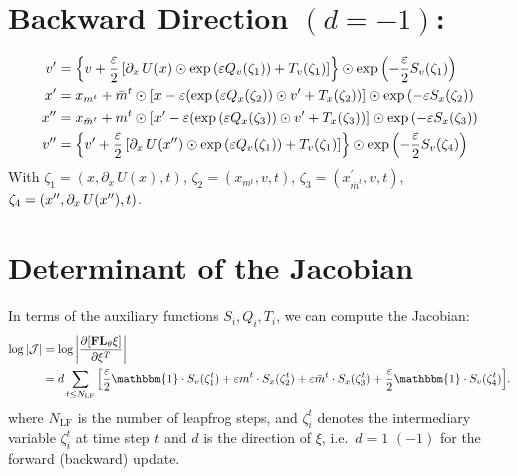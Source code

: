 \section{Backward Direction \texorpdfstring{$(d = -1)$}{(d = -1)}:}%
\label{sec:lf_backward}
%
\begin{align}
  v^{\prime} &= {\left\{v + \frac{\eps}{2}\left[\partial_{x}\,U(x)\odot
        \exp{\left(\eps Q_{v}(\zeta_{1})\right)}%
    + T_{v}(\zeta_{1})\right]\right\}} \odot
    \exp{\left(-\frac{\eps}{2}S_{v}(\zeta_{1})\right)} \\
  \xp &= x_{m^{t}} + \bar{m}^{t}\odot%
    {\left[x - \eps{\left(\exp{\left(\eps Q_{x}(\zeta_{2})\right)}\odot \vp%
    + T_{x}(\zeta_{2})\right)}\right]}\odot \exp{\left(-\eps
    S_{x}(\zeta_{2})\right)} \\ 
  \xpp &= x_{\bar{m}^{t}} + m^{t}\odot%
    {\left[\xp - \eps{\left(\exp{\left(\eps Q_{x}(\zeta_{3})\right)}\odot \vp%
    + T_{x}(\zeta_{3})\right)}\right]}\odot \exp{\left(-\eps
    S_{x}(\zeta_{3})\right)} \\
  v^{\prime\prime} &= {\left\{\vp +
      \frac{\eps}{2}\left[\partial_{x}\,U(\xpp)\odot%
        \exp{\left(\eps Q_{v}(\zeta_{1})\right)}
  + T_{v}(\zeta_{1})\right]\right\}}\odot 
    \exp{\left(-\frac{\eps}{2}S_{v}(\zeta_{4})\right)}
\label{eq:backward_update}
\end{align}
%
With $\zeta_{1} = (x, \partial_{x}\, U(x), t)$, $\zeta_{2} = (x_{m^{t}}, v,
t)$, $\zeta_{3} = (x^{\prime}_{\bar{m}^{t}}, v, t)$, $\zeta_{4} = ({x^{\prime\prime}},
\partial_{x}\, U({x^{\prime\prime}}), t)$.
%
\section{Determinant of the Jacobian}
In terms of the auxiliary functions $S_{i}, Q_{i}, T_{i}$, we can compute the
Jacobian:
%
\begin{align}
  \log|\mathcal{J}| 
  &= \log\bigg|\frac{\partial{\left[\mathbf{FL}_{\theta}\xi\right]}}{\partial
  \xi^{T}}\bigg|\\
  &= d \sum_{t\leq N_{\mathrm{LF}}}
    {\left[\frac{\eps}{2} \mathbbm{1}\cdot S_{v}(\zeta_{1}^{t}) + \eps m^{t}
        \cdot S_{x}(\zeta_{2}^{t}) 
      + \eps \bar{m}^{t} \cdot S_{x}(\zeta_{3}^{t}) + \frac{\eps}{2}\mathbbm{1}
\cdot S_{v}(\zeta_{4}^{t})\right]}.  \end{align}
%
where $N_{\mathrm{LF}}$ is the number of leapfrog steps, and $\zeta_{i}^{t}$
denotes the intermediary variable $\zeta_{i}^{t}$ at time step $t$ and $d$ is
the direction of $\xi$, i.e.\ $d = 1 \,\, (-1)$ for the forward (backward)
update.
%
%
